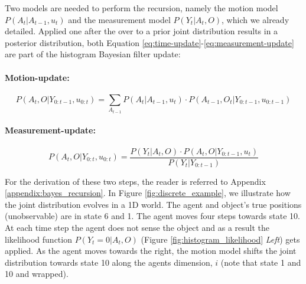 Two models are needed to perform the recursion, namely the motion model $P(A_t|A_{t-1},u_t)$ and the measurement model
$P(Y_t|A_t,O)$, which we already detailed. Applied one after the over to a prior joint distribution results in a posterior
distribution, both Equation \ref{eq:time-update}-\ref{eq:measurement-update} are part of the histogram Bayesian filter 
update:

\paragraph{Motion-update:}
\begin{equation}\label{eq:time-update}
   P(A_t,O|Y_{0:t-1},u_{0:t}) = \sum_{A_{t-1}} P(A_t|A_{t-1},u_t) \cdot  P(A_{t-1},O_t|Y_{0:t-1},u_{0:t-1})
\end{equation}
\paragraph{Measurement-update:}
\begin{equation}\label{eq:measurement-update}
   P(A_t,O|Y_{0:t},u_{0:t}) = \frac{P(Y_t|A_t,O)\cdot P(A_t,O|Y_{0:t-1},u_{t}) }{P(Y_t|Y_{0:t-1})}
\end{equation}

For the derivation of these  two steps, the reader is referred to Appendix \ref{appendix:bayes_recursion}.
In Figure \ref{fig:discrete_example}, we illustrate how the joint distribution evolves in a 1D world. 
The agent and object's true positions (unobservable) are in state 6 and 1. The agent moves four steps towards state 10. At each time 
step the agent does not sense the object and as a result the likelihood function  $P(Y_t=0|A_t,O)$ (Figure \ref{fig:histogram_likelihood} \textit{Left})
gets applied. As the agent moves towards the right, the motion model shifts the joint distribution towards state 10 along the agents 
dimension, $i$ (note that state 1 and 10 and wrapped).

